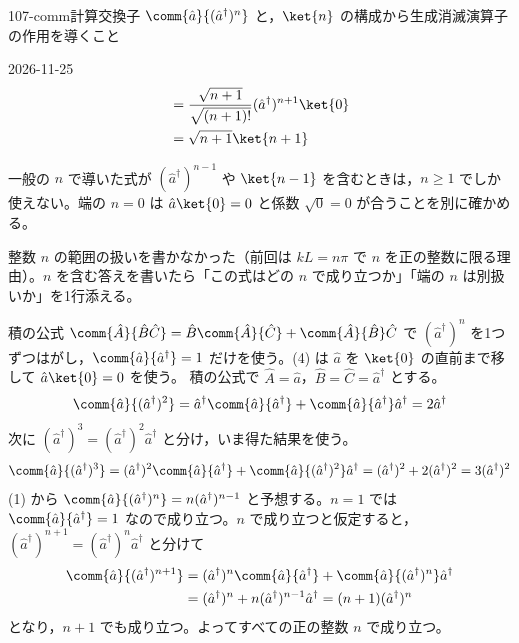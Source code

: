 \documentclass[uplatex,dvipdfmx,a4paper,11pt]{jsarticle}
\begin{document}
\begin{mondai}{107-comm}{計算}{交換子 $\comm{\hat{a}}{(\hat{a}^{\dagger})^{n}}$ と，$\ket{n}$ の構成から生成消滅演算子の作用を導くこと}
\begin{kotaeutsushi}{2026-11-25}
\begin{align*}
&=\frac{\sqrt{n+1}}{\sqrt{(n+1)!}}(\hat{a}^{\dagger})^{n+1}\ket{0}\\
&=\sqrt{n+1}\ket{n+1}
\end{align*}
\end{kotaeutsushi}
\begin{kizuki}
\item 一般の $n$ で導いた式が $(\hat{a}^{\dagger})^{n-1}$ や $\ket{n-1}$ を含むときは，$n\ge1$ でしか使えない。端の $n=0$ は $\hat{a}\ket{0}=0$ と係数 $\sqrt{0}=0$ が合うことを別に確かめる。
\item {} 整数 $n$ の範囲の扱いを書かなかった（前回は $kL=n\pi$ で $n$ を正の整数に限る理由）。$n$ を含む答えを書いたら「この式はどの $n$ で成り立つか」「端の $n$ は別扱いか」を1行添える。
\end{kizuki}
\begin{tadashii}
\houshin 積の公式 $\comm{\hat{A}}{\hat{B}\hat{C}}=\hat{B}\comm{\hat{A}}{\hat{C}}+\comm{\hat{A}}{\hat{B}}\hat{C}$ で $(\hat{a}^{\dagger})^{n}$ を1つずつはがし，$\comm{\hat{a}}{\hat{a}^{\dagger}}=1$ だけを使う。(4) は $\hat{a}$ を $\ket{0}$ の直前まで移して $\hat{a}\ket{0}=0$ を使う。
\keisan {} 積の公式で $\hat{A}=\hat{a}$，$\hat{B}=\hat{C}=\hat{a}^{\dagger}$ とする。
\[ \comm{\hat{a}}{(\hat{a}^{\dagger})^{2}}=\hat{a}^{\dagger}\comm{\hat{a}}{\hat{a}^{\dagger}}+\comm{\hat{a}}{\hat{a}^{\dagger}}\hat{a}^{\dagger}=2\hat{a}^{\dagger} \]
次に $(\hat{a}^{\dagger})^{3}=(\hat{a}^{\dagger})^{2}\hat{a}^{\dagger}$ と分け，いま得た結果を使う。
\[ \comm{\hat{a}}{(\hat{a}^{\dagger})^{3}}=(\hat{a}^{\dagger})^{2}\comm{\hat{a}}{\hat{a}^{\dagger}}+\comm{\hat{a}}{(\hat{a}^{\dagger})^{2}}\hat{a}^{\dagger}=(\hat{a}^{\dagger})^{2}+2(\hat{a}^{\dagger})^{2}=3(\hat{a}^{\dagger})^{2} \]
 (1) から $\comm{\hat{a}}{(\hat{a}^{\dagger})^{n}}=n(\hat{a}^{\dagger})^{n-1}$ と予想する。$n=1$ では $\comm{\hat{a}}{\hat{a}^{\dagger}}=1$ なので成り立つ。$n$ で成り立つと仮定すると，$(\hat{a}^{\dagger})^{n+1}=(\hat{a}^{\dagger})^{n}\hat{a}^{\dagger}$ と分けて
\begin{align*}
  \comm{\hat{a}}{(\hat{a}^{\dagger})^{n+1}}
  &=(\hat{a}^{\dagger})^{n}\comm{\hat{a}}{\hat{a}^{\dagger}}+\comm{\hat{a}}{(\hat{a}^{\dagger})^{n}}\hat{a}^{\dagger}\\
  &=(\hat{a}^{\dagger})^{n}+n(\hat{a}^{\dagger})^{n-1}\hat{a}^{\dagger}=(n+1)(\hat{a}^{\dagger})^{n}
\end{align*}
となり，$n+1$ でも成り立つ。よってすべての正の整数 $n$ で成り立つ。


\end{tadashii}
\end{mondai}
\end{document}
